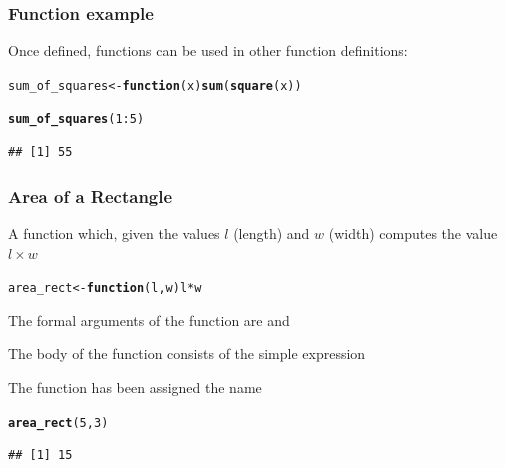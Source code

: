 \documentclass[12pt]{beamer}\usepackage[]{graphicx}\usepackage[]{color}
\makeatletter
\newcommand{\hlnum}[1]{\textcolor[rgb]{0.686,0.059,0.569}{#1}}%
\newcommand{\hlopt}[1]{\textcolor[rgb]{0,0,0}{#1}}%
\newcommand{\hlstd}[1]{\textcolor[rgb]{0.345,0.345,0.345}{#1}}%
\newcommand{\hlkwa}[1]{\textcolor[rgb]{0.161,0.373,0.58}{\textbf{#1}}}%
\newcommand{\hlkwb}[1]{\textcolor[rgb]{0.69,0.353,0.396}{#1}}%
\newcommand{\hlkwc}[1]{\textcolor[rgb]{0.333,0.667,0.333}{#1}}%
\newcommand{\hlkwd}[1]{\textcolor[rgb]{0.737,0.353,0.396}{\textbf{#1}}}%
\newenvironment{kframe}{%
 \def\at@end@of@kframe{}%
 \ifinner\ifhmode%
  \def\at@end@of@kframe{\end{minipage}}%
  \begin{minipage}{\columnwidth}%
 \fi\fi%
 \def\FrameCommand##1{\hskip\@totalleftmargin \hskip-\fboxsep
 \colorbox{shadecolor}{##1}\hskip-\fboxsep
     \hskip-\linewidth \hskip-\@totalleftmargin \hskip\columnwidth}%
 \MakeFramed {\advance\hsize-\width
   \@totalleftmargin\z@ \linewidth\hsize
   \@setminipage}}%
 {\par\unskip\endMakeFramed%
 \at@end@of@kframe}
\newenvironment{knitrout}{}{} %
\makeatother
\begin{document}
\begin{frame}[fragile]
\frametitle{Function example}

Once defined, functions can be used in other function definitions:
\begin{knitrout}\footnotesize
{}\color{fgcolor}\begin{kframe}
\begin{alltt}
\hlstd{sum_of_squares} \hlkwb{<-} \hlkwa{function}\hlstd{(}\hlkwc{x}\hlstd{)} \hlkwd{sum}\hlstd{(}\hlkwd{square}\hlstd{(x))}

\hlkwd{sum_of_squares}\hlstd{(}\hlnum{1}\hlopt{:}\hlnum{5}\hlstd{)}
\end{alltt}
\begin{verbatim}
## [1] 55
\end{verbatim}
\end{kframe}
\end{knitrout}

\end{frame}


\begin{frame}[fragile]
\frametitle{Area of a Rectangle}

A function which, given the values $l$ (length) and $w$ (width) computes the value $l \times w$
\begin{knitrout}\footnotesize
{}\color{fgcolor}\begin{kframe}
\begin{alltt}
\hlstd{area_rect} \hlkwb{<-} \hlkwa{function}\hlstd{(}\hlkwc{l}\hlstd{,} \hlkwc{w}\hlstd{) l} \hlopt{*} \hlstd{w}
\end{alltt}
\end{kframe}
\end{knitrout}
\bi
  \item The formal arguments of the function are  and 
  \item The body of the function consists of the simple expression 
  \item The function has been assigned the name 
\ei
\begin{knitrout}\footnotesize
{}\color{fgcolor}\begin{kframe}
\begin{alltt}
\hlkwd{area_rect}\hlstd{(}\hlnum{5}\hlstd{,} \hlnum{3}\hlstd{)}
\end{alltt}
\begin{verbatim}
## [1] 15
\end{verbatim}
\end{kframe}
\end{knitrout}
\end{frame}
\end{document}
